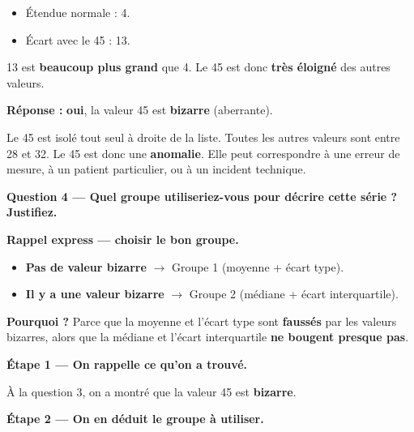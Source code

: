 \documentclass[12pt,a4paper]{article}
\begin{document}
\begin{itemize}[leftmargin=*]
  \item Étendue normale : 4.
  \item Écart avec le 45 : 13.
\end{itemize}

13 est \textbf{beaucoup plus grand} que 4. Le 45 est donc \textbf{très éloigné} des autres valeurs.

\vspace{0.3cm}
\textbf{Réponse :} \textbf{oui}, la valeur 45 est \textbf{bizarre} (aberrante).

\begin{enclair}
Le 45 est isolé tout seul à droite de la liste. Toutes les autres valeurs sont entre 28 et 32. Le 45 est donc une \textbf{anomalie}. Elle peut correspondre à une erreur de mesure, à un patient particulier, ou à un incident technique.
\end{enclair}

\vspace{0.5cm}

\begin{correctionbox}
\textbf{Question 4 — Quel groupe utiliseriez-vous pour décrire cette série ? Justifiez.}
\end{correctionbox}

\begin{rappelcible}
\textbf{Rappel express — choisir le bon groupe.}

\vspace{0.2cm}
\begin{itemize}[leftmargin=*]
  \item \textbf{Pas de valeur bizarre} $\rightarrow$ Groupe 1 (moyenne + écart type).
  \item \textbf{Il y a une valeur bizarre} $\rightarrow$ Groupe 2 (médiane + écart interquartile).
\end{itemize}

\vspace{0.2cm}
\textbf{Pourquoi ?} Parce que la moyenne et l'écart type sont \textbf{faussés} par les valeurs bizarres, alors que la médiane et l'écart interquartile \textbf{ne bougent presque pas}.
\end{rappelcible}

\vspace{0.3cm}
\textbf{Étape 1 — On rappelle ce qu'on a trouvé.}

À la question 3, on a montré que la valeur 45 est \textbf{bizarre}.

\vspace{0.3cm}
\textbf{Étape 2 — On en déduit le groupe à utiliser.}
\end{document}
